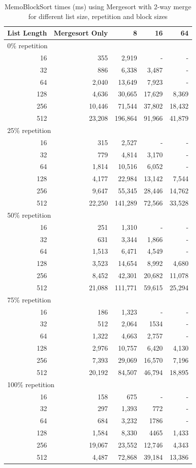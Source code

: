 \documentclass[a4paper,12pt]{article}
\begin{document}
\begin{table}[H]
\centering
\begin{tabular}{|r|r|r|r|r|}   \hline
	{List Length} & {Mergesort Only} & {8} & {16} & {64} \\  \hline
	\multicolumn{5}{|l|}{ 0\% repetition} \\ \hline
	16 &355&2,919&- & - \\ 
	32 &886&6,338&3,487 & -\\ 
	64 &2,040&13,649 & 7,923 &-\\ 
	128 &4,636&30,665&17,629&8,369\\ 
	256 &10,446&71,544&37,802&18,432\\ 
	512 &23,208& 196,864&91,966&41,879\\  \hline
	\multicolumn{5}{|l|}{ 25\% repetition} \\ \hline
	16 &315&2,527&- & - \\ 
	32 &779&4,814&3,170 & -\\ 
	64 &1,814&10,516 & 6,052&-\\ 
	128 &4,177&22,984&13,142&7,544\\ 
	256 &9,647&55,345&28,446&14,762\\ 
	512 &22,250&141,289&72,566&33,528\\  \hline
	\multicolumn{5}{|l|}{ 50\% repetition} \\ \hline
	16 &251&1,310&- & - \\ 
	32 &631&3,344&1,866 & -\\ 
	64 &1,513&6,471 & 4,549&-\\ 
	128 &3,523&14,654&8,992&4,680\\ 
	256 &8,452&42,301&20,682&11,078\\ 
	512 &21,088&111,771&59,615&25,294\\  \hline
	\multicolumn{5}{|l|}{ 75\% repetition} \\ \hline
	16 &186&1,323&- & - \\ 
	32 &512&2,064&1534 & -\\ 
	64 &1,322&4,663& 2,757&-\\ 
	128 &2,976&10,757&6,420&4,130\\ 
	256 &7,393&29,069&16,570&7,196\\ 
	512 &20,192&84,507&46,794&18,895\\  \hline
	\multicolumn{5}{|l|}{ 100\% repetition} \\ \hline
	16 &158&675&- & - \\ 
	32 &297&1,393&772 & -\\ 
	64 &684&3,232& 1786&-\\ 
	128 &1,584&8,330&4465&1,433\\ 
	256 &19,067&23,552&12,746&4,343\\ 
	512 &4,487&72,868&39,184&13,386\\  \hline
\end{tabular}
\caption{MemoBlockSort times (ms) using Mergesort with 2-way merge for different list size, repetition and block sizes}
\end{table}
\end{document}
